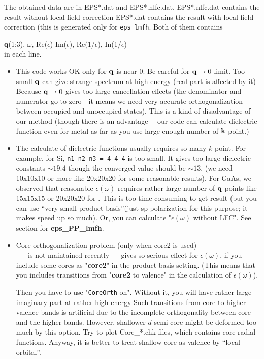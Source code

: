 \documentclass[a4paper,10pt,epsf,fleqn]{article}
\newcommand{\keyw}[1]{\fbox{\tt #1}}
\newcommand{\exe}[1]{{\bf #1}}
\newcommand{\io}[1]{{\sf  #1}}
\newcommand{\raw}[1]{{\tt #1}}
\begin{document}
The obtained data are in {\sf EPS*.dat} and {\sf EPS*.nlfc.dat}.
{\sf EPS*.nlfc.dat} contains the result without local-field correction
{\sf EPS*.dat} contains the result with local-field correction
(this is generated only for \verb#eps_lmfh#. Both of them contains

{\bf q}(1:3), $\omega$, Re($\epsilon$) Im($\epsilon$), Re(1/$\epsilon$), In(1/$\epsilon$)\\
in each line.

\begin{itemize}
 \item 
This code works OK only for ${\bf q}$ is near 0.
Be careful for ${\bf q} \to 0$ limit. Too small ${\bf q}$ can give strange
spectrum at high energy (real part is affected by it)\\

Because ${\bf q} \to 0$ gives too large cancellation effects
(the denominator and numerator go to zero---it means we need very accurate
orthogonalization between occupied and unoccupied states).
This is a kind of disadvantage of our method (though there is an advantage---
our code can calculate dielectric function even for metal 
as far as you use large enough number of ${\bf k}$ point.)

\item
The calculate of dielectric functions usually requires so many $k$ point. 
For example, for Si,  \verb#n1 n2 n3 = 4 4 4# is too small. 
It gives too large dielectric constants $\sim19.4$ though
the converged value should be $\sim13$. (we need 10x10x10 or more like 20x20x20
for some reasonable results).
For GaAs, we observed that reasonable $\epsilon(\omega)$ requires
rather large number of ${\bf q}$ points like 15x15x15 or 20x20x20
for \keyw{n1n2n3}. This is too time-consuming to get result
(but you can use ``very small product basis''(just sp polarization for this purpose;
it makes speed up so much). Or, you can calculate "$\epsilon(\omega)$ without LFC". 
See section for \exe{eps\_PP\_lmfh}.

\item Core orthogonalization problem (only when core2 is used)\\
----\keyw{CoreOrth} is not maintained recently ---
 \keyw{CoreOrth} gives so serious effect for 
$\epsilon(\omega)$, if you include some cores as "{\bf core2}"
in the product basis setting.
(This means that you includes transitions from "{\bf core2} to
valence" in the calculation of $\epsilon(\omega)$).

Then you have to use "\raw{CoreOrth} on". Without it,
you will have rather large imaginary part at rather high energy
Such transitions from core to higher valence bands
is artificial due to the incomplete orthogonality
between core and the higher bands.
However, shallower $d$ semi-core might be deformed too much
by this option. Try to plot \io{Core\_*.chk} files, 
which contains core radial functions. 
Anyway, it is better to treat shallow core as valence by ``local orbital''.
\end{itemize}
\end{document}
